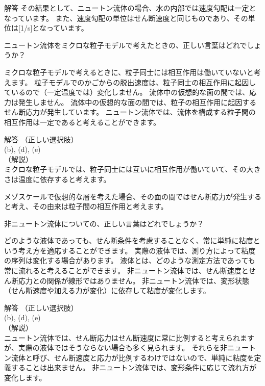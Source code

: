 \documentclass[uplatex,dvipdfmx,a4paper,11pt]{jsarticle}
\begin{document}
\begin{qlist}
\begin{itembox}[l]{解答}
            その結果として、ニュートン流体の場合、水の内部では速度勾配は一定となっています。
            また、速度勾配の単位はせん断速度と同じものであり、その単位は[1/s]となっています。
        \end{itembox}
	\qitem ニュートン流体をミクロな粒子モデルで考えたときの、正しい言葉はどれでしょうか？
		\begin{qlist2}
			\qitem ミクロな粒子モデルで考えるときに、粒子同士には相互作用は働いていないと考えます。
			\qitem 粒子モデルでのかごからの脱出速度は、粒子同士の相互作用に起因しているので（一定温度では）変化しません。
			\qitem 流体中の仮想的な面の間では、応力は発生しません。
			\qitem 流体中の仮想的な面の間では、粒子の相互作用に起因するせん断応力が発生しています。
			\qitem ニュートン流体では、流体を構成する粒子間の相互作用は一定であると考えることができます。
		\end{qlist2}
		\vspace{3mm}
        \begin{itembox}[l]{解答}
            （正しい選択肢）\\
            (b), (d), (e)\\
            （解説）\\
            ミクロな粒子モデルでは、粒子同士には互いに相互作用が働いていて、その大きさは温度に依存すると考えます。
            
            メゾスケールで仮想的な層を考えた場合、その面の間ではせん断応力が発生すると考え、その由来は粒子間の相互作用と考えます。
        \end{itembox}
	\qitem 非ニュートン流体についての、正しい言葉はどれでしょうか？
		\begin{qlist2}
			\qitem どのような液体であっても、せん断条件を考慮することなく、常に単純に粘度という考え方を適応することができます。
			\qitem 実際の液体では、測り方によって粘度の序列は変化する場合があります。
			\qitem 液体とは、どのような測定方法であっても常に流れると考えることができます。
			\qitem 非ニュートン流体では、せん断速度とせん断応力との関係が線形ではありません。
			\qitem 非ニュートン流体では、変形状態（せん断速度や加える力が変化）に依存して粘度が変化します。
		\end{qlist2}
		\vspace{3mm}
        \begin{itembox}[l]{解答}
            （正しい選択肢）\\
            (b), (d), (e)\\
            （解説）\\
            ニュートン流体では、せん断応力はせん断速度に常に比例すると考えられますが、実際の液体ではそうならない場合も多く見られます。
            それらを非ニュートン流体と呼び、せん断速度と応力が比例するわけではないので、単純に粘度を定義することは出来ません。
            非ニュートン流体では、変形条件に応じて流れ方が変化します。


\end{itembox}
\end{qlist}
\end{document}
